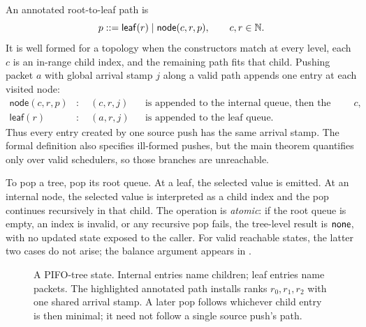 An annotated root-to-leaf path is
\[
  p ::= \mathsf{leaf}(r)
      \mid \mathsf{node}(c,r,p),
  \qquad c,r\in\mathbb{N}.
\]
It is well formed for a topology when the constructors match at every level,
each \(c\) is an in-range child index, and the remaining path fits that child.
Pushing packet \(a\) with global arrival stamp \(j\) along a valid path appends
one entry at each visited node:
\begin{align*}
 \mathsf{node}(c,r,p)&:\quad (c,r,j)
     &&\text{is appended to the internal queue, then the push follows child }c,\\
 \mathsf{leaf}(r)&:\quad (a,r,j)
     &&\text{is appended to the leaf queue.}
\end{align*}
Thus every entry created by one source push has the same arrival stamp.  The
formal definition also specifies ill-formed pushes, but the main theorem
quantifies only over valid schedulers, so those branches are unreachable.

To pop a tree, pop its root queue.  At a leaf, the selected value is emitted.
At an internal node, the selected value is interpreted as a child index and the
pop continues recursively in that child.  The operation is \emph{atomic}: if
the root queue is empty, an index is invalid, or any recursive pop fails, the
tree-level result is \(\mathsf{none}\), with no updated state exposed to the caller.
For valid reachable states, the latter two cases do not arise; the balance
argument appears in .

\begin{figure}[t]
\centering
{}
\caption{A PIFO-tree state.  Internal entries name children; leaf entries name
packets.  The highlighted annotated path installs ranks \(r_0,r_1,r_2\) with
one shared arrival stamp.  A later pop follows whichever child entry is then
minimal; it need not follow a single source push's path.}
\label{fig:model-tree}
\end{figure}

